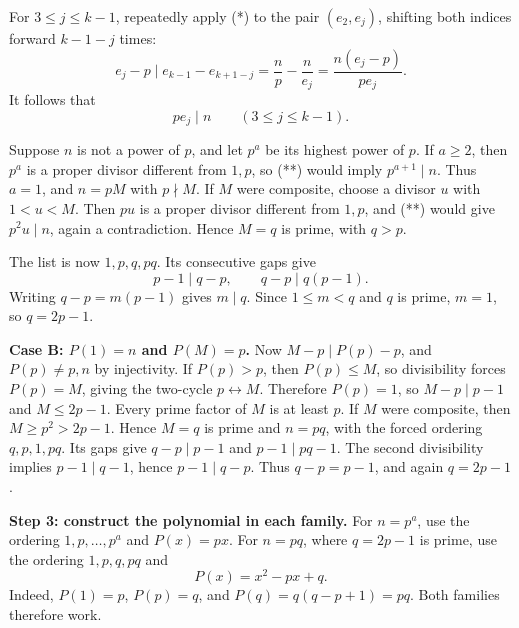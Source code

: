 \documentclass[12pt]{memoir}
\begin{document}
\begin{Ej}
For \(3\leq j\leq k-1\), repeatedly apply (*) to the pair
\((e_2,e_j)\), shifting both indices forward \(k-1-j\) times:
\[
    e_j-p\mid e_{k-1}-e_{k+1-j}
    =\frac np-\frac n{e_j}
    =\frac{n(e_j-p)}{pe_j}.
\]
It follows that
\begin{equation*}
    pe_j\mid n\qquad(3\leq j\leq k-1). \tag{**}
\end{equation*}

Suppose \(n\) is not a power of \(p\), and let \(p^a\) be its
highest power of \(p\). If \(a\geq2\), then \(p^a\) is a proper
divisor different from \(1,p\), so (**) would imply
\(p^{a+1}\mid n\). Thus \(a=1\), and \(n=pM\) with \(p\nmid M\).
If \(M\) were composite, choose a divisor \(u\) with \(1<u<M\).
Then \(pu\) is a proper divisor different from \(1,p\), and (**)
would give \(p^2u\mid n\), again a contradiction.
Hence \(M=q\) is prime, with \(q>p\).

The list is now \(1,p,q,pq\). Its consecutive gaps give
\[
    p-1\mid q-p,\qquad q-p\mid q(p-1).
\]
Writing \(q-p=m(p-1)\) gives \(m\mid q\). Since \(1\leq m<q\)
and \(q\) is prime, \(m=1\), so \(q=2p-1\).

\textbf{Case B: \(P(1)=n\) and \(P(M)=p\).}
Now \(M-p\mid P(p)-p\), and \(P(p)\ne p,n\) by injectivity.
If \(P(p)>p\), then \(P(p)\leq M\), so divisibility forces
\(P(p)=M\), giving the two-cycle \(p\leftrightarrow M\).
Therefore \(P(p)=1\), so \(M-p\mid p-1\) and \(M\leq2p-1\).
Every prime factor of \(M\) is at least \(p\). If \(M\) were
composite, then \(M\geq p^2>2p-1\). Hence \(M=q\) is prime and
\(n=pq\), with the forced ordering \(q,p,1,pq\).
Its gaps give \(q-p\mid p-1\) and \(p-1\mid pq-1\).
The second divisibility implies \(p-1\mid q-1\), hence
\(p-1\mid q-p\). Thus \(q-p=p-1\), and again \(q=2p-1\).

\textbf{Step 3: construct the polynomial in each family.}
For \(n=p^a\), use the ordering \(1,p,\ldots,p^a\) and
\(P(x)=px\).
For \(n=pq\), where \(q=2p-1\) is prime, use the ordering
\(1,p,q,pq\) and
\[
    P(x)=x^2-px+q.
\]
Indeed, \(P(1)=p\), \(P(p)=q\), and
\(P(q)=q(q-p+1)=pq\). Both families therefore work.
\end{Ej}

\fi
\end{document}
